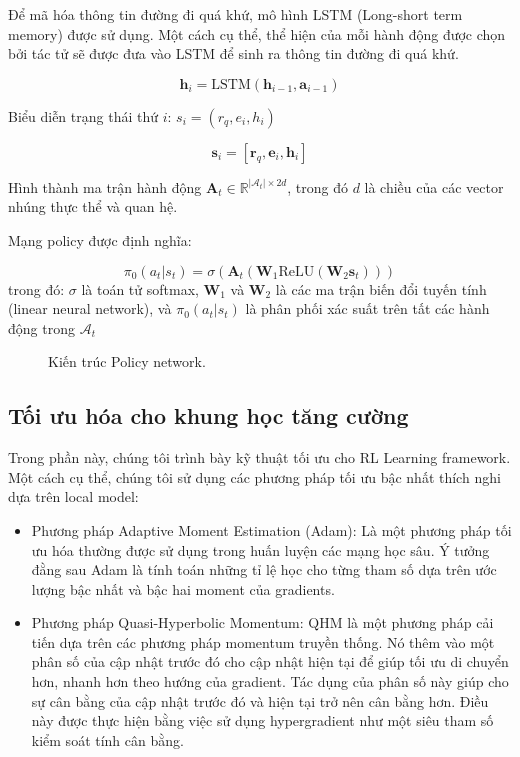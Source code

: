 Để mã hóa thông tin đường đi quá khứ, mô hình LSTM (Long-short term memory) được sử dụng. Một cách cụ thể,
thể hiện của mỗi hành động được chọn bởi tác tử sẽ được đưa vào LSTM để sinh ra thông tin đường đi quá khứ.

\begin{equation}
    \mathbf{h}_i = \text{LSTM}(\mathbf{h}_{i-1}, \mathbf{a}_{i-1})
\end{equation}

Biểu diễn trạng thái thứ $i$: $s_i = (r_q, e_i, h_i)$

\begin{equation}
    \mathbf{s}_i = [\mathbf{r}_q, \mathbf{e}_i, \mathbf{h}_i]
\end{equation}

Hình thành ma trận hành động $\mathbf{A}_t \in \mathbb{R}^{|\mathcal{A}_t| \times 2d}$,
trong đó $d$ là chiều của các vector nhúng thực thể và quan hệ.

Mạng policy được định nghĩa:

\begin{equation}
    \pi_0(a_t | s_t) = \sigma(\mathbf{A}_t(\mathbf{W}_1\text{ReLU}(\mathbf{W}_2\mathbf{s}_t)))
\end{equation}
trong đó: $\sigma$ là toán tử softmax, $\mathbf{W}_1$ và $\mathbf{W}_2$ là các ma trận biến đổi tuyến tính (linear neural network),
và $\pi_0(a_t | s_t)$ là phân phối xác suất trên tất các hành động trong $\mathcal{A}_t$

\begin{center}
    \centering
    \begin{figure}[h!]
        
        \caption{Kiến trúc Policy network.}
        \label{fig:policy_network_arch}
    \end{figure}
\end{center}

\subsection{Tối ưu hóa cho khung học tăng cường}

Trong phần này, chúng tôi trình bày kỹ thuật tối ưu cho RL Learning framework. Một cách cụ thể, chúng tôi sử dụng các phương pháp tối ưu bậc nhất
thích nghi dựa trên local model:
\begin{itemize}
    \item Phương pháp Adaptive Moment Estimation (Adam):  Là một phương pháp tối ưu hóa thường được sử dụng trong huấn luyện các mạng học sâu. 
    Ý tưởng đằng sau Adam là tính toán những tỉ lệ học cho từng tham số dựa trên ước lượng bậc nhất và bậc hai moment của gradients.
    \item Phương pháp Quasi-Hyperbolic Momentum: QHM là một phương pháp cải tiến dựa trên các phương pháp momentum truyền thống. Nó thêm vào một phân số
    của cập nhật trước đó cho cập nhật hiện tại để giúp tối ưu di chuyển hơn, nhanh hơn theo hướng của gradient. Tác dụng của phân số này giúp cho sự cân bằng của 
    cập nhật trước đó và hiện tại trở nên cân bằng hơn. Điều này được thực hiện bằng việc sử dụng hypergradient như một siêu tham số kiểm soát tính cân bằng.
\end{itemize}

